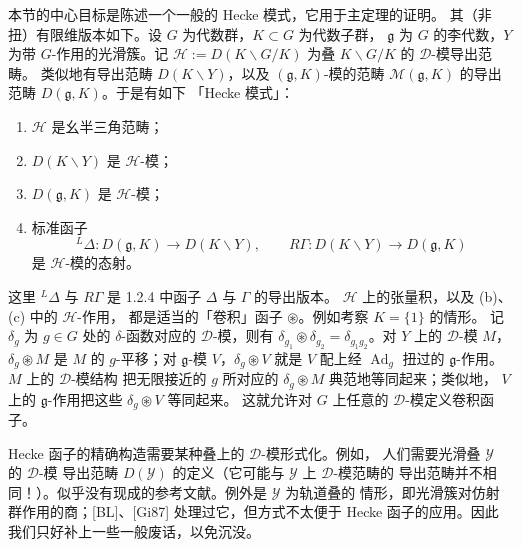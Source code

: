 




 本节的中心目标是陈述一个一般的 Hecke 模式，它用于主定理的证明。
其（非扭）有限维版本如下。设 $G$ 为代数群，$K\subset G$ 为代数子群，
$\mathfrak{g}$ 为 $G$ 的李代数，$Y$ 为带 $G$-作用的光滑簇。记
$\mathcal{H}:=D(K\backslash G/K)$ 为叠 $K\backslash G/K$ 的 $\mathcal{D}$-模导出范畴。
类似地有导出范畴 $D(K\backslash Y)$，以及 $(\mathfrak{g},K)$-模的范畴
$\mathcal{M}(\mathfrak{g},K)$ 的导出范畴 $D(\mathfrak{g},K)$。于是有如下
「Hecke 模式」：
\begin{enumerate}[label=(\alph*),leftmargin=2.2em]
\item $\mathcal{H}$ 是幺半三角范畴；
\item $D(K\backslash Y)$ 是 $\mathcal{H}$-模；
\item $D(\mathfrak{g},K)$ 是 $\mathcal{H}$-模；
\item 标准函子
\[
{}^{L}\Delta:D(\mathfrak{g},K)\longrightarrow D(K\backslash Y),
\qquad
R\Gamma:D(K\backslash Y)\longrightarrow D(\mathfrak{g},K)
\]
是 $\mathcal{H}$-模的态射。
\end{enumerate}

这里 ${}^{L}\Delta$ 与 $R\Gamma$ 是 1.2.4 中函子 $\Delta$ 与 $\Gamma$ 的导出版本。
$\mathcal{H}$ 上的张量积，以及 (b)、(c) 中的 $\mathcal{H}$-作用，
都是适当的「卷积」函子 $\circledast$。例如考察 $K=\{1\}$ 的情形。
记 $\delta_g$ 为 $g\in G$ 处的 $\delta$-函数对应的 $\mathcal{D}$-模，则有
$\delta_{g_1}\circledast\delta_{g_2}=\delta_{g_1g_2}$。对 $Y$ 上的
$\mathcal{D}$-模 $M$，$\delta_g\circledast M$ 是 $M$ 的 $g$-平移；对
$\mathfrak{g}$-模 $V$，$\delta_g\circledast V$ 就是 $V$ 配上经
$\operatorname{Ad}_g$ 扭过的 $\mathfrak{g}$-作用。$M$ 上的 $\mathcal{D}$-模结构
把无限接近的 $g$ 所对应的 $\delta_g\circledast M$ 典范地等同起来；类似地，
$V$ 上的 $\mathfrak{g}$-作用把这些 $\delta_g\circledast V$ 等同起来。
这就允许对 $G$ 上任意的 $\mathcal{D}$-模定义卷积函子。

 Hecke 函子的精确构造需要某种叠上的 $\mathcal{D}$-模形式化。例如，
人们需要光滑叠 $\mathcal{Y}$ 的 $\mathcal{D}$-模%
%
导出范畴 $D(\mathcal{Y})$ 的定义（它可能与 $\mathcal{Y}$ 上 $\mathcal{D}$-模范畴的
导出范畴并不相同！）。似乎没有现成的参考文献。例外是 $\mathcal{Y}$ 为轨道叠的
情形，即光滑簇对仿射群作用的商；[BL]、[Gi87] 处理过它，但方式不太便于
Hecke 函子的应用。因此我们只好补上一些一般废话，以免沉没。

